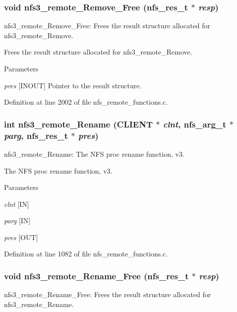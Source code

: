 \subsubsection[{nfs3\_\-remote\_\-Remove\_\-Free}]{\setlength{\rightskip}{0pt plus 5cm}void nfs3\_\-remote\_\-Remove\_\-Free (nfs\_\-res\_\-t $\ast$ {\em resp})}\label{group__NFSprocs_gaf545f0c1feb970bf349509f03a2a3802}
nfs3\_\-remote\_\-Remove\_\-Free: Frees the result structure allocated for nfs3\_\-remote\_\-Remove.

Frees the result structure allocated for nfs3\_\-remote\_\-Remove.


\begin{DoxyParams}{Parameters}
\item[{\em pres}][INOUT] Pointer to the result structure. \end{DoxyParams}


Definition at line 2002 of file nfs\_\-remote\_\-functions.c.
\subsubsection[{nfs3\_\-remote\_\-Rename}]{\setlength{\rightskip}{0pt plus 5cm}int nfs3\_\-remote\_\-Rename (CLIENT $\ast$ {\em clnt}, \/  nfs\_\-arg\_\-t $\ast$ {\em parg}, \/  nfs\_\-res\_\-t $\ast$ {\em pres})}\label{group__NFSprocs_gac4c5cf0eec99981815308f9c52ccb3a5}
nfs3\_\-remote\_\-Rename: The NFS proc rename function, v3.

The NFS proc rename function, v3.


\begin{DoxyParams}{Parameters}
\item[{\em clnt}][IN] \item[{\em parg}][IN] \item[{\em pres}][OUT] \end{DoxyParams}


Definition at line 1082 of file nfs\_\-remote\_\-functions.c.
\subsubsection[{nfs3\_\-remote\_\-Rename\_\-Free}]{\setlength{\rightskip}{0pt plus 5cm}void nfs3\_\-remote\_\-Rename\_\-Free (nfs\_\-res\_\-t $\ast$ {\em resp})}\label{group__NFSprocs_ga66615d0d81d49408227c56748ef1a7b3}
nfs3\_\-remote\_\-Rename\_\-Free: Frees the result structure allocated for nfs3\_\-remote\_\-Rename.

